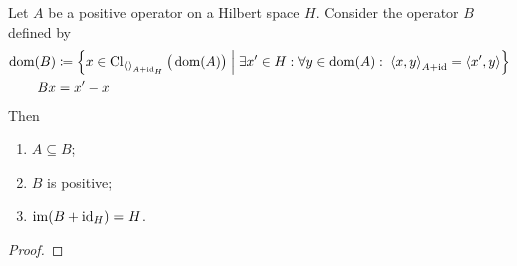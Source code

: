 \begin{lemma}
Let $A$ be a positive operator on a Hilbert space $H$. Consider the operator $B$ defined by
\begin{align*}
\dom(B) &\defeq \setbuilder{x\in \Closure_{\inner{}_{A+\id_H}}\big(\dom(A)\big)}{\exists x'\in H: \forall y\in \dom(A): \; \inner{x, y}_{A+\id} = \inner{x', y}} \\
Bx &= x' - x 
\end{align*}
Then
\begin{enumerate}
\item $A\subseteq B$;
\item $B$ is positive;
\item $\operatorname{im}(B+\operatorname{id}_H) = H$.
\end{enumerate}
\end{lemma}
\begin{proof}

\end{proof}

